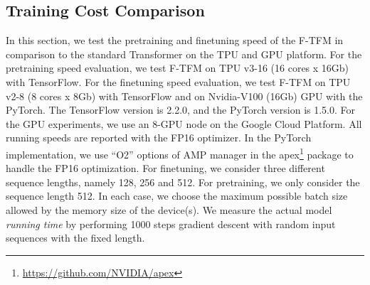 \documentclass{article}
\theoremstyle{custom}
\begin{document}
\subsection{Training Cost Comparison}
\label{sec:appendix-training-cost}
In this section, we test the pretraining and finetuning speed of the F-TFM in comparison to the standard Transformer on the TPU and GPU platform.
For the pretraining speed evaluation, we test F-TFM on TPU v3-16 (16 cores x 16Gb) with TensorFlow. 
For the finetuning speed evaluation, we test F-TFM on TPU v2-8 (8 cores x 8Gb) with TensorFlow and on Nvidia-V100 (16Gb) GPU with the PyTorch.
The TensorFlow version is 2.2.0, and the PyTorch version is 1.5.0.
For the GPU experiments, we use an 8-GPU node on the Google Cloud Platform.
All running speeds are reported with the FP16 optimizer.
In the PyTorch implementation, we use ``O2'' options of AMP manager in the apex\footnote{\url{https://github.com/NVIDIA/apex}} package to handle the FP16 optimization.
For finetuning, we consider three different sequence lengths, namely 128, 256 and 512.
For pretraining, we only consider the sequence length 512.
In each case, we choose the maximum possible batch size allowed by the memory size of the device(s). 
We measure the actual model \textit{running time} by performing 1000 steps gradient descent with random input sequences with the fixed length. 
\end{document}
